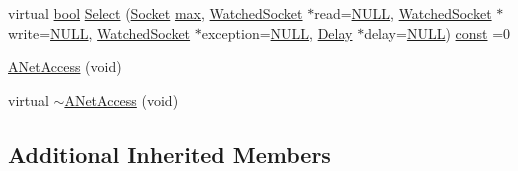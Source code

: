 \begin{DoxyCompactItemize}
virtual \hyperlink{term__entry_8h_a002004ba5d663f149f6c38064926abac}{bool} \hyperlink{classbpt_1_1_net_abs_1_1_a_net_access_a3324f59b90393e765198fddbc5f6d144}{Select} (\hyperlink{classbpt_1_1_net_abs_1_1_i_net_access_ae5a8cad46f8006b85b535f126b697efc}{Socket} \hyperlink{curses_8priv_8h_affe776513b24d84b39af8ab0930fef7f}{max}, \hyperlink{classbpt_1_1_net_abs_1_1_i_net_access_1_1_watched_socket}{Watched\-Socket} $\ast$read=\hyperlink{internal_8h_a070d2ce7b6bb7e5c05602aa8c308d0c4}{N\-U\-L\-L}, \hyperlink{classbpt_1_1_net_abs_1_1_i_net_access_1_1_watched_socket}{Watched\-Socket} $\ast$write=\hyperlink{internal_8h_a070d2ce7b6bb7e5c05602aa8c308d0c4}{N\-U\-L\-L}, \hyperlink{classbpt_1_1_net_abs_1_1_i_net_access_1_1_watched_socket}{Watched\-Socket} $\ast$exception=\hyperlink{internal_8h_a070d2ce7b6bb7e5c05602aa8c308d0c4}{N\-U\-L\-L}, \hyperlink{classbpt_1_1_net_abs_1_1_i_net_access_a0bbbaf7492f6c93185acd8b359a347d1}{Delay} $\ast$delay=\hyperlink{internal_8h_a070d2ce7b6bb7e5c05602aa8c308d0c4}{N\-U\-L\-L}) \hyperlink{term__entry_8h_a57bd63ce7f9a353488880e3de6692d5a}{const} =0
\item 
\hyperlink{classbpt_1_1_net_abs_1_1_a_net_access_a4baab577685f9a020bffd796cd16aacc}{A\-Net\-Access} (void)
\item 
virtual \hyperlink{classbpt_1_1_net_abs_1_1_a_net_access_aa7c691a088c3079e19c8c1fe8d484d33}{$\sim$\-A\-Net\-Access} (void)
\end{DoxyCompactItemize}
\subsection*{Additional Inherited Members}


